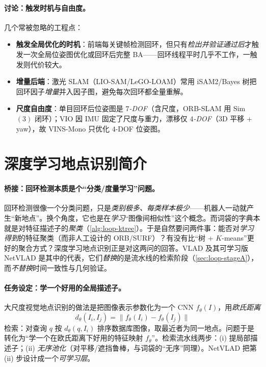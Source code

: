 \paragraph{讨论：触发时机与自由度。}
几个常被忽略的工程点\cite{gaoxiang2019slam14,murartal2015orbslam,qin2018vins}：
\begin{itemize}
  \item \textbf{触发全局优化的时机}：前端每关键帧检测回环，但只有\emph{检出并验证通过后}才触发一次全局位姿图优化或回环后完整 BA——回环线程平时几乎不工作，一触发则代价较大。
  \item \textbf{增量后端}：激光 SLAM（LIO-SAM/LeGO-LOAM）常用 iSAM2/Bayes 树把回环因子\emph{增量}并入因子图\cite{kaess2012isam2}，避免每次回环都全量重解。
  \item \textbf{尺度自由度}：单目回环后位姿图是 \emph{$7$-DOF}（含尺度，ORB-SLAM 用 Sim$(3)$ 闭环\cite{murartal2015orbslam}）；VIO 因 IMU 固定了尺度与重力，漂移仅 \emph{$4$-DOF}（$3$D 平移 + yaw），故 VINS-Mono 只优化 $4$-DOF 位姿图\cite{qin2018vins}。
\end{itemize}

\section{深度学习地点识别简介}
\label{sec:loop-dl}

\paragraph{桥接：回环检测本质是个“分类/度量学习”问题。}
回环检测很像一个分类问题，只是\emph{类别极多、每类样本极少}\cite{gaoxiang2019slam14}——机器人一动就产生“新地点”。换个角度，它也是在\emph{学习}“图像间相似性”这个概念。而词袋的字典本就是对特征描述子的\emph{聚类}（\cref{alg:loop-ktree}）。于是自然要问两件事：能否对\emph{学习得到}的特征聚类（而非人工设计的 ORB/SURF）？有没有比“树 + $K$-means”更好的聚合方式？深度学习地点识别正是对这两问的回答。VLAD 及其可学习版 NetVLAD\cite{arandjelovic2016netvlad} 是其中的代表，它们\emph{替换}的是流水线的检索阶段（\cref{sec:loop-stageA}），而\emph{不替换}时间一致性与几何验证。

\paragraph{任务设定：学一个好用的全局描述子。}
大尺度视觉地点识别的做法\cite{arandjelovic2016netvlad}是把图像表示参数化为一个 CNN $f_\theta(I)$，用\emph{欧氏距离}
\begin{equation}
  d_\theta(I_i,I_j)=\lVert f_\theta(I_i)-f_\theta(I_j)\rVert
  \label{eq:loop-netvlad-dist}
\end{equation}
检索：对查询 $q$ 按 $d_\theta(q,I_i)$ 排序数据库图像，取最近者为同一地点。问题于是转化为“学一个在欧氏距离下好用的特征映射 $f_\theta$”。检索流水线两步：(i) 提局部描述子；(ii) \emph{无序池化}（对平移/遮挡鲁棒，与词袋的“无序”同理）。NetVLAD 把第 (ii) 步设计成一个\emph{可学习层}。

